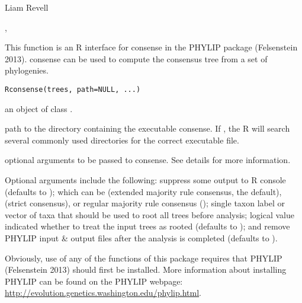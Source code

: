 \documentclass[a4paper]{book}
\begin{document}
%
\begin{Author}\relax
Liam Revell 
\end{Author}
%
\begin{SeeAlso}\relax
{}, 
\end{SeeAlso}
%
\begin{Description}\relax
This function is an R interface for consense in the PHYLIP package (Felsenstein 2013). consense can be used to compute the consensus tree from a set of phylogenies. 
\end{Description}
%
\begin{Usage}
\begin{verbatim}
Rconsense(trees, path=NULL, ...)
\end{verbatim}
\end{Usage}
%
\begin{Arguments}
\begin{ldescription}
\item[\code{trees}] an object of class .
\item[\code{path}] path to the directory containing the executable consense. If , the R will search several commonly used directories for the correct executable file.
\item[\code{...}] optional arguments to be passed to consense. See details for more information.
\end{ldescription}
\end{Arguments}
%
\begin{Details}\relax
Optional arguments include the following:  suppress some output to R console (defaults to );  which can be  (extended majority rule consensus, the default),  (strict consensus), or regular majority rule consensus ();  single taxon label or vector of taxa that should be used to root all trees before analysis;  logical value indicated whether to treat the input trees as rooted (defaults to ); and  remove PHYLIP input \& output files after the analysis is completed (defaults to ).

Obviously, use of any of the functions of this package requires that PHYLIP (Felsenstein 2013) should first be installed. More information about installing PHYLIP can be found on the PHYLIP webpage: \url{http://evolution.genetics.washington.edu/phylip.html}.
\end{Details}
\end{document}
